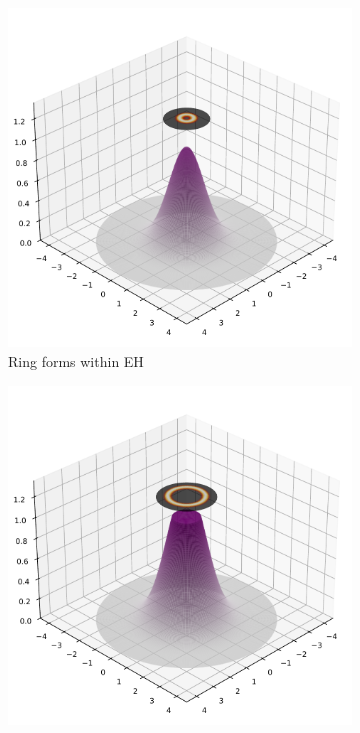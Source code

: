 \documentclass[12pt]{article}
\begin{document}
\begin{figure}[H]
  \begin{subfigure}[b]{0.3\textwidth}
    \includegraphics[width=\textwidth]{ring_forms_inside_eh.pdf}
    \caption{Ring forms within EH}
  \end{subfigure}
  \hfill
  \begin{subfigure}[b]{0.3\textwidth}
    \includegraphics[width=\textwidth]{sigma_crit_reached.pdf}

\end{subfigure}
\end{figure}
\end{document}
